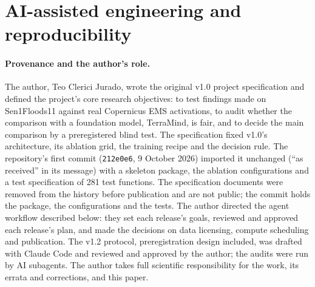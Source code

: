 \documentclass[10pt,twocolumn,a4paper]{article}
\begin{document}
\section{AI-assisted engineering and reproducibility}\label{sec:ai}

\paragraph{Provenance and the author's role.} The author, Teo Clerici Jurado, wrote the original v1.0 project
specification and defined the project's core research objectives: to test findings made on Sen1Floods11 against real
Copernicus EMS activations, to audit whether the comparison with a foundation model, TerraMind, is fair, and to decide
the main comparison by a preregistered blind test. The specification fixed v1.0's architecture, its ablation grid,
the training recipe and the decision rule. The repository's first commit (\texttt{212e0e6}, 9 October 2026) imported
it unchanged (``as received'' in its message) with a skeleton package, the ablation configurations and a test
specification of 281 test functions. The specification documents were removed from the history before publication
and are not public; the commit holds the package, the configurations and the tests. The author directed the agent
workflow described below: they set each release's goals, reviewed and approved each release's plan, and made the
decisions on data licensing, compute scheduling and publication. The v1.2 protocol, preregistration design included,
was drafted with Claude Code and reviewed and approved by the author; the audits were run by AI subagents. The author
takes full scientific responsibility for the work, its errata and corrections, and this paper.
\end{document}
